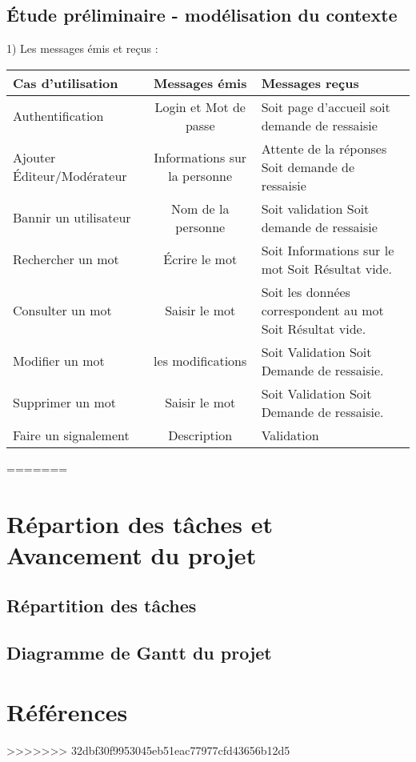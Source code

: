 \documentclass[12pt,a4paper]{article}
\begin{document}
\subsection{Étude préliminaire - modélisation du contexte}

1) Les messages émis et reçus : \\

\begin{tabularx}{\textwidth}{|l|c|X|}
  \hline
  \textbf{Cas d'utilisation} & 
  \textbf{Messages émis} & 
  \textbf{Messages reçus} \\
  \hline
  Authentification & 
  Login et Mot de passe & Soit page d'accueil soit demande de ressaisie
  \\ 
   \hline
  \hline
 Ajouter Éditeur/Modérateur & Informations sur la personne & Attente de la réponses Soit demande de ressaisie
    \\
  \hline
  \hline
 Bannir un utilisateur & Nom de la personne  &  Soit validation Soit demande de ressaisie
    \\
  \hline
    \hline
 Rechercher un mot & Écrire le mot &  Soit Informations sur le mot Soit Résultat vide.
    \\
  \hline
   \hline
 Consulter un mot & Saisir le mot &  Soit les données correspondent au mot Soit Résultat vide.
    \\
  \hline
   \hline
 Modifier un mot & les modifications &  Soit Validation  Soit Demande de ressaisie.
    \\
  \hline
    \hline
 Supprimer un mot & Saisir le mot &  Soit Validation  Soit Demande de ressaisie.
    \\
  \hline
      \hline
 Faire un signalement & Description &  Validation
    \\
  \hline
\end{tabularx}
=======
\section{Répartion des tâches et Avancement du projet}

\subsection{Répartition des tâches}
\subsection{Diagramme de Gantt du projet}

\section{Références}
>>>>>>> 32dbf30f9953045eb51eac77977cfd43656b12d5
\end{document}
